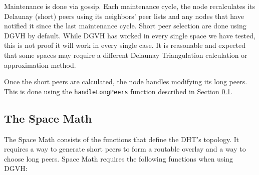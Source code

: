 Maintenance is done via gossip.
Each maintenance cycle, the node recalculates its Delaunay (short) peers using its neighbors' peer lists and any nodes that have notified it since the last maintenance cycle.
Short peer selection are done using DGVH by default.
While DGVH has worked in every single space we have tested, this is not proof it will work in every single case.
It is reasonable and expected that some spaces may require a different Delaunay Triangulation calculation or approximation method.

Once the short peers are calculated, the node handles modifying its long peers.
This is done using the \texttt{handleLongPeers} function described in Section \ref{sec:space}.

\subsection{The Space Math}
\label{sec:space}
The Space Math consists of the functions that define the DHT's topology.
It requires a way to generate short peers to form a routable overlay and a way to choose long peers.
Space Math requires the following functions when using DGVH:

